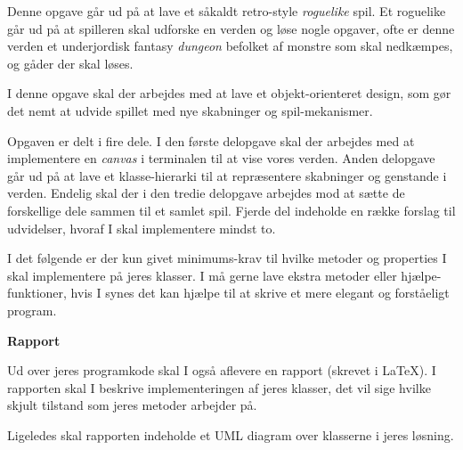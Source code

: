 
Denne opgave går ud på at lave et såkaldt retro-style \emph{roguelike}
spil. Et roguelike går ud på at spilleren skal udforske en verden og løse
nogle opgaver, ofte er denne verden et underjordisk fantasy
\emph{dungeon} befolket af monstre som skal nedkæmpes, og gåder der
skal løses.

I denne opgave skal der arbejdes med at lave et objekt-orienteret
design, som gør det nemt at udvide spillet med nye skabninger og
spil-mekanismer.

Opgaven er delt i fire dele. I den første delopgave skal der arbejdes
med at implementere en \emph{canvas} i terminalen til at vise vores
verden. Anden delopgave går ud på at lave et klasse-hierarki til at
repræsentere skabninger og genstande i verden. Endelig skal der i den
tredie delopgave arbejdes mod at sætte de forskellige dele sammen til
et samlet spil. Fjerde del indeholde en række forslag til udvidelser,
hvoraf I skal implementere mindst to.

I det følgende er der kun givet minimums-krav til hvilke metoder og
properties I skal implementere på jeres klasser. I må gerne lave
ekstra metoder eller hjælpe-funktioner, hvis I synes det kan hjælpe
til at skrive et mere elegant og forståeligt program.

\textbf{Rapport}

Ud over jeres programkode skal I også aflevere en rapport (skrevet i
\LaTeX). I rapporten skal I beskrive implementeringen af jeres
klasser, det vil sige hvilke skjult tilstand som jeres metoder
arbejder på.

Ligeledes skal rapporten indeholde et UML diagram over klasserne i
jeres løsning.


